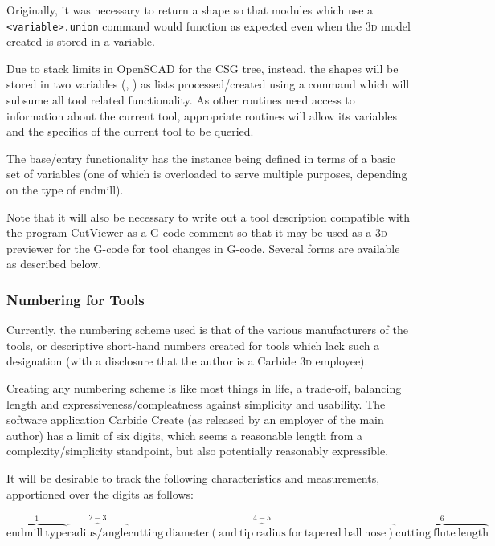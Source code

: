 \documentclass{ltxdoc}
\begin{document}
Originally, it was necessary to return a shape so that modules which use a \verb|<variable>.union| command would function as expected even when the \textsc{3d} model created is stored in a variable.

Due to stack limits in OpenSCAD for the CSG tree, instead, the shapes will be stored in two variables (, ) as lists processed/created using a command  which will subsume all tool related functionality. As other routines need access to information about the current tool, appropriate routines will allow its variables and the specifics of the current tool to be queried. 

The base/entry functionality has the instance being defined in terms of a basic set of variables (one of which is overloaded to serve multiple purposes, depending on the type of endmill).

Note that it will also be necessary to write out a tool description compatible with the program CutViewer as a G-code comment so that it may be used as a \textsc{3d} previewer for the G-code for tool changes in G-code. Several forms are available as described below.

\subsubsection{Numbering for Tools}

Currently, the numbering scheme used is that of the various manufacturers of the tools, or descriptive short-hand numbers created for tools which lack such a designation (with a disclosure that the author is a Carbide \textsc{3d} employee).

Creating any numbering scheme is like most things in life, a trade-off, balancing length and expressiveness/compleatness against simplicity and usability. The software application Carbide Create (as released by an employer of the main author) has a limit of six digits, which seems a reasonable length from a complexity/simplicity standpoint, but also potentially reasonably expressible.

It will be desirable to track the following characteristics and measurements, apportioned over the digits as follows:

\begin{equation*}
\overbrace{\mathrm{endmill\ type}}^1
\overbrace{\mathrm{radius/angle}}^{2-3}
\overbrace{\mathrm{cutting\ diameter (and\ tip\ radius\ for\ tapered\ ball\ nose)}}^{4-5}
\overbrace{\mathrm{cutting\ flute\ length}}^6
\end{equation*}
\end{document}
